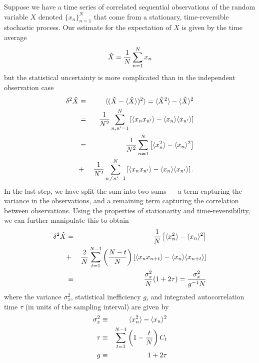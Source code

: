 Suppose we have a time series of correlated sequential observations of the random variable $X$ denoted $\{ x_n \}_{n=1}^{N}$ that come from a stationary, time-reversible stochastic process. Our estimate for the expectation of $X$ is given by the time average
\begin{eqnarray}
\hat{X} = \frac{1}{N} \sum_{n=1}^N x_n
\end{eqnarray}
but the statistical uncertainty is more complicated than in the independent observation case
\begin{eqnarray}
\delta^2 \hat{X} &\equiv& \langle (\hat{X} - \langle \hat{X} \rangle)^2 \rangle = \langle \hat{X}^2 \rangle - \langle \hat{X} \rangle^2 \nonumber \\
&=& \frac{1}{N^2} \sum_{n,n'=1}^N \left[ \langle x_n x_{n'} \rangle - \langle x_n \rangle\langle x_{n'} \rangle \right] \nonumber \\
&=& \frac{1}{N^2} \sum_{n=1}^N \left[ \langle x_n^2 \rangle - \langle x_n \rangle^2 \right] \nonumber \\
\mbox{} &+& \frac{1}{N^2} \sum_{n\ne n' = 1}^N \left[ \langle x_n x_{n'} \rangle - \langle x_n \rangle\langle x_{n'} \rangle \right] .
\end{eqnarray}
In the last step, we have split the sum into two sums --- a term capturing the variance in the observations, and a remaining term capturing the correlation between observations. Using the properties of stationarity and time-reversibility, we can further manipulate this to obtain
\begin{eqnarray}
\delta^2 \hat{X} &=& \frac{1}{N} \left[ \langle x_n^2 \rangle - \langle x_n \rangle^2 \right] \nonumber \\
\mbox{} &+& \frac{2}{N} \sum_{t=1}^{N-1} \left(\frac{N-t}{N}\right) \left[ \langle x_n x_{n+t} \rangle - \langle x_n \rangle\langle x_{n+t} \rangle \right]  \nonumber \\
&\equiv& \frac{\sigma_x^2}{N}(1 + 2 \tau) = \frac{\sigma_x^2}{g^{-1} N}
\end{eqnarray}
where the variance $\sigma_x^2$, statistical inefficiency $g$, and integrated autocorrelation time $\tau$ (in units of the sampling interval) are given by
\begin{eqnarray}
\sigma_x^2 &\equiv& \langle x_n^2 \rangle - \langle x_n \rangle^2 \label{wham:equation:variance-definition} \\
\tau &\equiv& \sum_{t=1}^{N-1} \left(1 - \frac{t}{N}\right) C_t \label{wham:equation:integrated-autocorrelation-time-definition} \\
g &\equiv& 1 + 2 \tau \label{wham:equation:statistical-inefficiency-definition}
\end{eqnarray}
